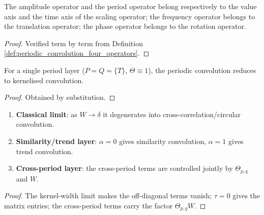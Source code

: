 \begin{proposition}\label{prop:periodic_convolution_grammar}
The amplitude operator and the period operator belong respectively to the value axis and the time axis of the scaling operator; the frequency operator belongs to the translation operator; the phase operator belongs to the rotation operator.
\end{proposition}

\begin{proof}
Verified term by term from Definition \ref{def:periodic_convolution_four_operators}.
\end{proof}

\begin{proposition}\label{prop:periodic_convolution_kernelized}
For a single period layer ($P = Q = \{T\}$, $\Theta \equiv 1$), the periodic convolution reduces to kernelised convolution.
\end{proposition}

\begin{proof}
Obtained by substitution.
\end{proof}

\begin{theorem}\label{thm:periodic_convolution_degeneracies}
\begin{enumerate}[label=(\roman*)]
    \item \textbf{Classical limit}: as $W \to \delta$ it degenerates into cross-correlation/circular convolution.
    \item \textbf{Similarity/trend layer}: $\alpha = 0$ gives similarity convolution, $\alpha = 1$ gives trend convolution.
    \item \textbf{Cross-period layer}: the cross-period terms are controlled jointly by $\Theta_{p,q}$ and $W$.
\end{enumerate}
\end{theorem}

\begin{proof}
The kernel-width limit makes the off-diagonal terms vanish; $\tau = 0$ gives the matrix entries; the cross-period terms carry the factor $\Theta_{p,q} W$.
\end{proof}

